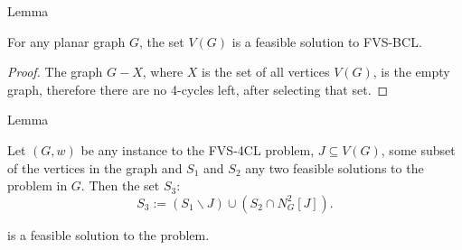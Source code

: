 \begin{mydefinition}{Lemma}
    \label{lemma-guessable}

    For any planar graph $G$, the set $V(G)$ is a feasible solution to FVS-BCL.

\end{mydefinition}


\begin{proof}
    The graph $G - X$, where $X$ is the set of all vertices $V(G)$, is the empty graph, 
    therefore there are no 4-cycles left, after selecting that set.
\end{proof}

\begin{mydefinition}{Lemma}
    \label{lemma-m-stitchable}

    Let $(G, w)$ be any instance to the FVS-4CL problem, $J \subseteq V(G)$, some subset
    of the vertices in the graph 
    and $S_1$ and $S_2$ any two feasible solutions to the problem in $G$. Then the set $S_3$:
    \[S_3 := (S_1 \backslash J) \cup (S_2 \cap N^{2}_{G} \left[J\right]).\]
    
    is a feasible solution to the problem.


\end{mydefinition}

